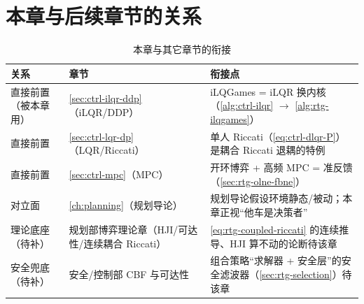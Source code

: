 \section*{本章与后续章节的关系}
\begin{table}[H]\centering\small
\caption{本章与其它章节的衔接}
\label{tab:rtg-relations}
\begin{tabular}{p{} p{} p{}}
\toprule
关系 & 章节 & 衔接点 \\
\midrule
直接前置（被本章用） & \cref{sec:ctrl-ilqr-ddp}（iLQR/DDP） & iLQGames = iLQR 换内核（\cref{alg:ctrl-ilqr} $\to$ \cref{alg:rtg-ilqgames}） \\
直接前置 & \cref{sec:ctrl-lqr-dp}（LQR/Riccati） & 单人 Riccati（\cref{eq:ctrl-dlqr-P}）是耦合 Riccati 退耦的特例 \\
直接前置 & \cref{sec:ctrl-mpc}（MPC） & 开环博弈 + 高频 MPC = 准反馈（\cref{sec:rtg-olne-fbne}） \\
对立面 & \cref{ch:planning}（规划导论） & 规划导论假设环境静态/被动；本章正视“他车是决策者” \\
理论底座（待补） & 规划部博弈理论章（HJI/可达性/连续耦合 Riccati） & \cref{eq:rtg-coupled-riccati} 的连续推导、HJI 算不动的论断待该章 \cref \\
安全兜底（待补） & 安全/控制部 CBF 与可达性 & 组合策略“求解器 + 安全层”的安全滤波器（\cref{sec:rtg-selection}）待该章 \cref \\
\bottomrule
\end{tabular}
\end{table}

